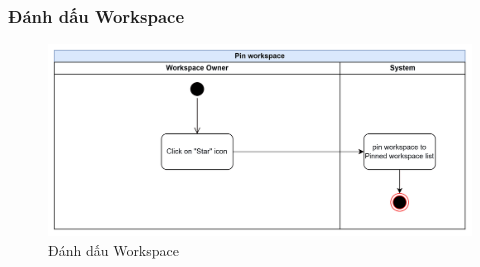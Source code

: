 \subsubsection{Đánh dấu Workspace}
    \begin{figure}[H]
        \centering
        \includegraphics[width=\linewidth]{Content/Phân tích và thiết kế hệ thống/documents/Sơ đồ hoạt động/images/pinWorkspace.png}
        \vspace{0.5cm}
        \caption{Đánh dấu Workspace}
        \label{fig:Đánh dấu Workspace}
    \end{figure}